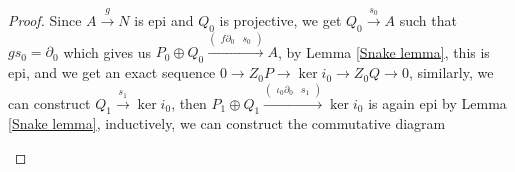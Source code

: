 \documentclass[../main.tex]{subfiles}
\begin{document}
\begin{proof}
Since $A\xrightarrow{g}N$ is epi and $Q_0$ is projective, we get $Q_0\xrightarrow{s_0}A$ such that $gs_0=\partial_0$ which gives us $P_0\oplus Q_0\xrightarrow{\begin{pmatrix} f\partial_0 & s_0 \end{pmatrix}}A$, by Lemma \ref{Snake lemma}, this is epi, and we get an exact sequence $0\to Z_0P\to \ker i_0\to Z_0Q\to0$, similarly, we can construct $Q_1\xrightarrow{s_1}\ker i_0$, then $P_1\oplus Q_1\xrightarrow{\begin{pmatrix} \iota_0\partial_0 & s_1 \end{pmatrix}}\ker i_0$ is again epi by Lemma \ref{Snake lemma}, inductively, we can construct the commutative diagram
\begin{center}
\end{center}
\end{proof}
\end{document}
